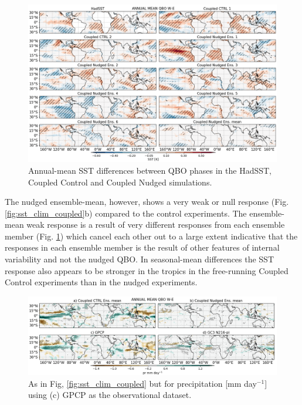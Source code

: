 \begin{figure}[t!]
\centering
 \includegraphics[width=\linewidth]{figures/sst_check_climqbowqboe.png}
\caption[SST response in MAM to the QBO in coupled nudged experiments]{Annual-mean SST differences between QBO phases in the HadSST, Coupled Control and Coupled Nudged simulations.}
\label{fig:sst_ens}
\end{figure}

The nudged ensemble-mean, however, shows a very weak or null response (Fig. \ref{fig:sst_clim_coupled}b) compared to the control experiments. 
The ensemble-mean weak response is a result of very different responses from each ensemble member (Fig. \ref{fig:sst_ens}) which cancel each other out to a large extent indicative that the responses in each ensemble member is the result of other features of internal variability and not the nudged QBO.
In seasonal-mean differences the SST response also appears to be stronger in the tropics in the free-running Coupled Control experiments than in the nudged experiments. 

\begin{figure}[t!]
\centering
 \includegraphics[width=\linewidth]{figures/prseasonal_climqbowqboe.png}
\caption[Annual mean SST response to the QBO in coupled nudged experiments]{ As in Fig, \ref{fig:sst_clim_coupled} but for precipitation [mm day$^{-1}$] using (c) GPCP as the observational dataset.}
\label{fig:pr_clim_coupled}
\end{figure}


